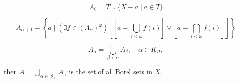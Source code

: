 $$A_0 = T \cup \{X - a \mid a \in T\}$$

$$A_{\alpha+1} = \left\{a \mid (\exists f \in (A_\alpha)^\omega) \left[ \left[ a = \bigcup_{i < \omega} f(i) \right] \vee \left[ a = \bigcap_{i < \omega} f(i) \right] \right] \right\}$$

$$A_\alpha = \bigcup_{\beta < \alpha} A_\beta, \quad \alpha \in K_{\Pi},$$

then $A = \bigcup_{\alpha \in \aleph_1} A_\alpha$ is the set of all Borel sets in $X$.
